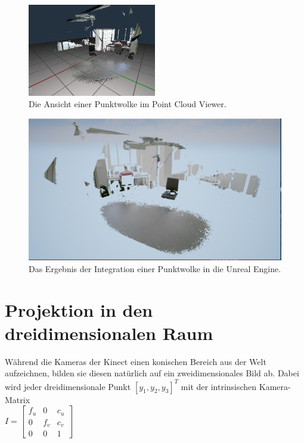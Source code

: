 \documentclass[a4paper]{IEEEtran}
\begin{document}
	\begin{figure}[!h]
    	\centering
		\includegraphics[width=0.5\textwidth]{img/CloudPCViewer}
	    \caption{Die Ansicht einer Punktwolke im Point Cloud Viewer.}
    	\label{CloudPCViewer}
	\end{figure}

	\begin{figure}[t]
    	\centering
		\includegraphics[width=\textwidth]{img/Cloud}
	    \caption{Das Ergebnis der Integration einer Punktwolke in die Unreal Engine.}
    	\label{Cloud}
	\end{figure} 
\section{Projektion in den dreidimensionalen Raum}
	Während die Kameras der Kinect einen konischen Bereich aus der Welt aufzeichnen, bilden sie diesen natürlich auf ein zweidimensionales Bild ab. 
	Dabei wird jeder dreidimensionale Punkt $[y_1,y_2,y_3]^T$ mit der intrinsischen Kamera-Matrix \\ [1cm]

$I = \begin{bmatrix}
f_u & 0 & c_u  \\
0 & f_v & c_v  \\
0 & 0 & 1  
\end{bmatrix}$\\[1cm]
\end{document}
